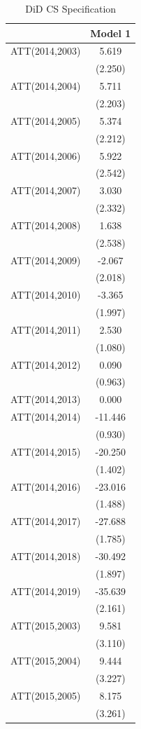 \documentclass[
  12pt,
]{article}
\begin{document}
\begin{table}

\caption{\label{tab:Tab-6}DiD CS Specification}
\centering
\begin{tabular}[t]{lc}
\toprule
  & Model 1\\
\midrule
ATT(2014,2003) & 5.619\\
 & (2.250)\\
ATT(2014,2004) & 5.711\\
 & (2.203)\\
ATT(2014,2005) & 5.374\\
 & (2.212)\\
ATT(2014,2006) & 5.922\\
 & (2.542)\\
ATT(2014,2007) & 3.030\\
 & (2.332)\\
ATT(2014,2008) & 1.638\\
 & (2.538)\\
ATT(2014,2009) & -2.067\\
 & (2.018)\\
ATT(2014,2010) & -3.365\\
 & (1.997)\\
ATT(2014,2011) & 2.530\\
 & (1.080)\\
ATT(2014,2012) & 0.090\\
 & (0.963)\\
ATT(2014,2013) & 0.000\\
ATT(2014,2014) & -11.446\\
 & (0.930)\\
ATT(2014,2015) & -20.250\\
 & (1.402)\\
ATT(2014,2016) & -23.016\\
 & (1.488)\\
ATT(2014,2017) & -27.688\\
 & (1.785)\\
ATT(2014,2018) & -30.492\\
 & (1.897)\\
ATT(2014,2019) & -35.639\\
 & (2.161)\\
ATT(2015,2003) & 9.581\\
 & (3.110)\\
ATT(2015,2004) & 9.444\\
 & \vphantom{1} (3.227)\\
ATT(2015,2005) & 8.175\\
 & (3.261)\\

\end{tabular}
\end{table}
\end{document}
